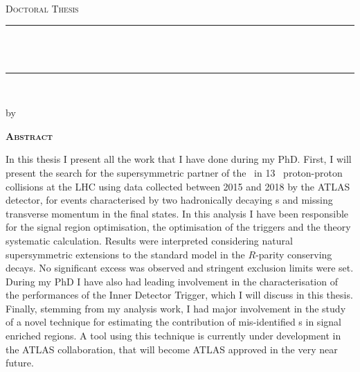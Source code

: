 
\thispagestyle{empty}

\begin{center}

    {\normalsize \href{http://www.sussex.ac.uk/}{\myUni} \\} %
    {\normalsize \myFaculty \\} %
    {\normalsize \myDepartment \\} %
    \bigskip\vspace*{.02\textheight}
    {\Large \textsc{Doctoral Thesis}}\par
    \bigskip
    
    {\rule{\linewidth}{1pt}\\%
    \Large \myTitle \\
    \large  \mySubtitle \par} %
    \rule{\linewidth}{1pt}\\[0.4cm]
    
    \bigskip
	{\normalsize by \myName \par} %
    \bigskip\vspace*{.06\textheight}
\end{center}

    {\centering\Huge\textsc{\textbf{Abstract}} \par}
    \bigskip



    \noindent In this thesis I present all the work that I have done during my PhD. First, I will present the search for the supersymmetric partner of the \ltau\ in 13 \tev\ proton-proton collisions at the LHC using data collected between 2015 and 2018 by the ATLAS detector, for events characterised by two hadronically decaying \ltau s
    and missing transverse momentum in the final states. In this analysis I have been responsible for the signal region optimisation, the optimisation of the triggers and the theory systematic calculation. Results were interpreted considering natural supersymmetric extensions to the standard model in the $R$-parity conserving decays. No significant excess was observed and stringent exclusion limits were set. 
    During my PhD I have also had leading involvement in the characterisation of the performances of the Inner Detector Trigger, which I will discuss in this thesis. 
Finally, stemming from my analysis work, I had major involvement in the study of a novel technique for estimating the contribution of mis-identified \ltau s in signal enriched regions. A tool using this technique is currently under development in the ATLAS collaboration, that will become ATLAS approved in the very near future. 
    

